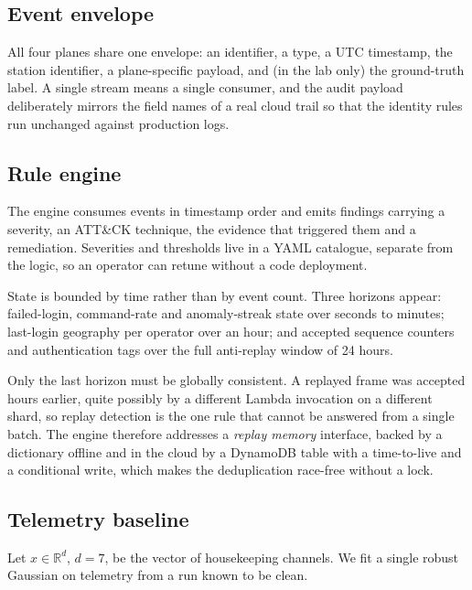 \documentclass[conference]{IEEEtran}
\begin{document}
\subsection{Event envelope}

All four planes share one envelope: an identifier, a type, a UTC timestamp, the
station identifier, a plane-specific payload, and (in the lab only) the
ground-truth label. A single stream means a single consumer, and the audit
payload deliberately mirrors the field names of a real cloud trail so that the
identity rules run unchanged against production logs.

\subsection{Rule engine}

The engine consumes events in timestamp order and emits findings carrying a
severity, an ATT\&CK technique, the evidence that triggered them and a
remediation. Severities and thresholds live in a YAML catalogue, separate from
the logic, so an operator can retune without a code deployment.

State is bounded by time rather than by event count. Three horizons appear:
failed-login, command-rate and anomaly-streak state over seconds to minutes;
last-login geography per operator over an hour; and accepted sequence counters
and authentication tags over the full anti-replay window of 24 hours.

Only the last horizon must be globally consistent. A replayed frame was accepted
hours earlier, quite possibly by a different Lambda invocation on a different
shard, so replay detection is the one rule that cannot be answered from a single
batch. The engine therefore addresses a \emph{replay memory} interface, backed
by a dictionary offline and in the cloud by a DynamoDB table with a time-to-live
and a conditional write, which makes the deduplication race-free without a
lock.

\subsection{Telemetry baseline}
\label{sec:model}

Let $x \in \mathbb{R}^{d}$, $d = 7$, be the vector of housekeeping channels. We
fit a single robust Gaussian on telemetry from a run known to be clean.
\end{document}
